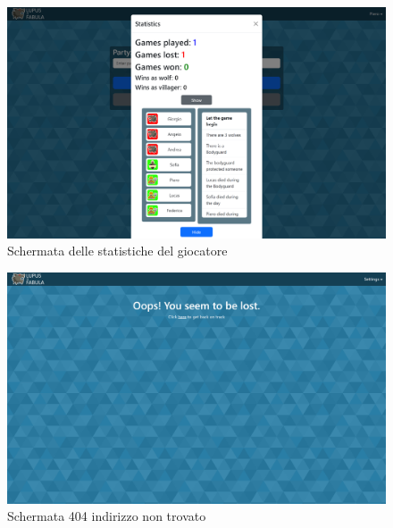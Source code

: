 \begin{figure}[H]
\centering
\includegraphics[width=\textwidth]{img/screen/desktop/stats_desktop.png}
\caption{Schermata delle statistiche del giocatore}
\label{fig:stats_desktop}
\end{figure}

\begin{figure}[H]
\centering
\includegraphics[width=\textwidth]{img/screen/desktop/404_desktop.png}
\caption{Schermata 404 indirizzo non trovato}
\label{fig:404_desktop}
\end{figure}